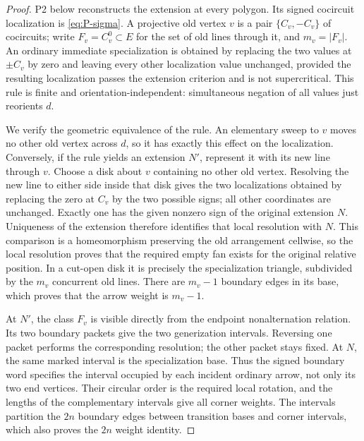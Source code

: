 \documentclass[11pt,a4paper]{article}
\begin{document}
\begin{proof}
P2 below reconstructs the extension at every polygon.  Its signed
cocircuit localization is \eqref{eq:P-sigma}.  A projective old vertex
$v$ is a pair $\{C_v,-C_v\}$ of cocircuits; write
$F_v=C_v^0\subset E$ for the set of old lines through it, and
$m_v=|F_v|$.  An ordinary immediate specialization is obtained by
replacing the two values at $\pm C_v$ by zero and leaving every other
localization value unchanged, provided the resulting localization
passes the extension criterion and is not supercritical.  This rule
is finite and orientation-independent: simultaneous negation of all
values just reorients $d$.

We verify the geometric equivalence of the rule.  An elementary sweep
to $v$ moves no other old vertex across $d$, so it has exactly this
effect on the localization.  Conversely, if the rule yields an
extension $N'$, represent it with its new line through $v$.  Choose a
disk about $v$ containing no other old vertex.  Resolving the new line
to either side inside that disk gives the two localizations obtained
by replacing the zero at $C_v$ by the two possible signs; all other
coordinates are unchanged.  Exactly one has the given nonzero sign
of the original extension $N$.  Uniqueness of the extension therefore
identifies that local resolution with $N$.  This comparison is a
homeomorphism preserving the old arrangement cellwise, so the local
resolution proves that the required empty fan exists for the original
relative position.  In a cut-open disk it is precisely the
specialization triangle, subdivided by the $m_v$ concurrent old
lines.  There are $m_v-1$ boundary edges in its base, which proves
that the arrow weight is $m_v-1$.

At $N'$, the class $F_v$ is visible directly from the endpoint
nonalternation relation.  Its two boundary packets give the two
generization intervals.  Reversing one packet performs the
corresponding resolution; the other packet stays fixed.  At $N$, the
same marked interval is the specialization base.  Thus the signed
boundary word specifies the interval occupied by each incident
ordinary arrow, not only its two end vertices.  Their circular order
is the required local rotation, and the lengths of the complementary
intervals give all corner weights.  The intervals partition the
$2n$ boundary edges between transition bases and corner intervals,
which also proves the $2n$ weight identity.


\end{proof}
\end{document}
